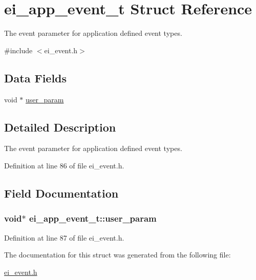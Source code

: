 \hypertarget{structei__app__event__t}{\section{ei\-\_\-app\-\_\-event\-\_\-t Struct Reference}
\label{structei__app__event__t}
}


The event parameter for application defined event types.  




{\ttfamily \#include $<$ei\-\_\-event.\-h$>$}

\subsection*{Data Fields}
\begin{DoxyCompactItemize}
\item 
void $\ast$ \hyperlink{structei__app__event__t_a236a89c3726aa9c770da42ba37ce3d3f}{user\-\_\-param}
\end{DoxyCompactItemize}


\subsection{Detailed Description}
The event parameter for application defined event types. 

Definition at line 86 of file ei\-\_\-event.\-h.



\subsection{Field Documentation}
\hypertarget{structei__app__event__t_a236a89c3726aa9c770da42ba37ce3d3f}{
\subsubsection[{user\-\_\-param}]{\setlength{\rightskip}{0pt plus 5cm}void$\ast$ ei\-\_\-app\-\_\-event\-\_\-t\-::user\-\_\-param}}\label{structei__app__event__t_a236a89c3726aa9c770da42ba37ce3d3f}


Definition at line 87 of file ei\-\_\-event.\-h.



The documentation for this struct was generated from the following file\-:\begin{DoxyCompactItemize}
\item 
\hyperlink{ei__event_8h}{ei\-\_\-event.\-h}\end{DoxyCompactItemize}
